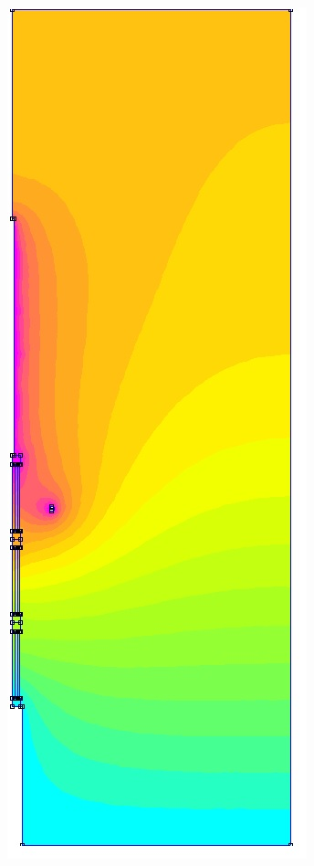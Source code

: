 \begin{figure}[h!]
\begin{subfigure}[h]{.35\textwidth}
		\includegraphics[width=\textwidth]{data/NoBoundary}

\end{subfigure}
\end{figure}
